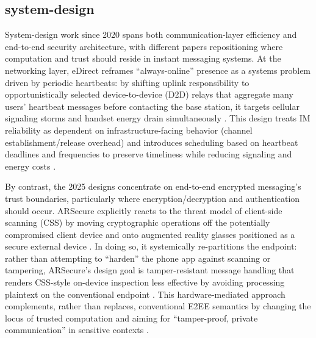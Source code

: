 \subsection{system-design}
System-design work since 2020 spans both communication-layer efficiency and end-to-end security architecture, with different papers repositioning where computation and trust should reside in instant messaging systems. At the networking layer, eDirect reframes “always-online” presence as a systems problem driven by periodic heartbeats: by shifting uplink responsibility to opportunistically selected device-to-device (D2D) relays that aggregate many users’ heartbeat messages before contacting the base station, it targets cellular signaling storms and handset energy drain simultaneously \cite{yi2020}. This design treats IM reliability as dependent on infrastructure-facing behavior (channel establishment/release overhead) and introduces scheduling based on heartbeat deadlines and frequencies to preserve timeliness while reducing signaling and energy costs \cite{yi2020}.

By contrast, the 2025 designs concentrate on end-to-end encrypted messaging’s trust boundaries, particularly where encryption/decryption and authentication should occur. ARSecure explicitly reacts to the threat model of client-side scanning (CSS) by moving cryptographic operations off the potentially compromised client device and onto augmented reality glasses positioned as a secure external device \cite{alsop2025}. In doing so, it systemically re-partitions the endpoint: rather than attempting to “harden” the phone app against scanning or tampering, ARSecure’s design goal is tamper-resistant message handling that renders CSS-style on-device inspection less effective by avoiding processing plaintext on the conventional endpoint \cite{alsop2025}. This hardware-mediated approach complements, rather than replaces, conventional E2EE semantics by changing the locus of trusted computation and aiming for “tamper-proof, private communication” in sensitive contexts \cite{alsop2025}.

